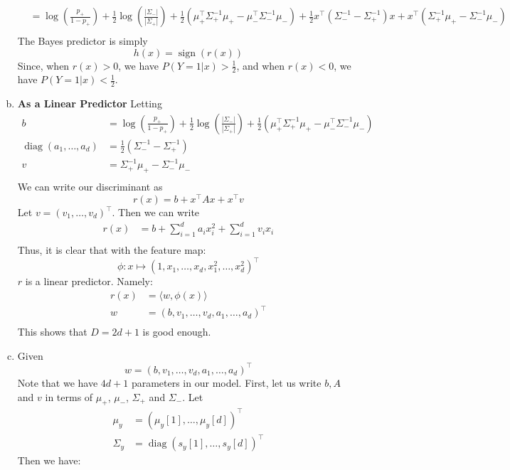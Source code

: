 \documentclass{amsart}
\DeclareMathOperator{\diag}{diag}
\DeclareMathOperator{\sign}{sign}
\theoremstyle{definition}
\begin{document}
\begin{enumerate}[(a)]
\begin{align*}
			&= \log\left(\frac{p_+}{1-p_+}\right) + \frac12 \log\left(\frac{|\Sigma_-|}{|\Sigma_+|}\right) + \frac{1}{2}(\mu_+^\intercal\Sigma_{+}^{-1}\mu_+ - \mu_-^\intercal\Sigma_{-}^{-1}\mu_-)+ \frac{1}{2}x^\intercal(\Sigma_{-}^{-1} - \Sigma_{+}^{-1})x + x^\intercal(\Sigma_+^{-1}\mu_+-\Sigma_-^{-1}\mu_-)\\
		\end{align*}
		The Bayes predictor is simply
		\[h(x) = \sign(r(x))\]
		Since, when $r(x) > 0$, we have $P(Y = 1|x) > \frac{1}{2}$, and when $r(x) < 0$, we have $P(Y = 1|x) < \frac{1}{2}$.
	\item {\bf As a Linear Predictor}
		Letting 
		\begin{align*}
			b &= \log\left(\frac{p_+}{1-p_+}\right) + \frac12 \log\left(\frac{|\Sigma_-|}{|\Sigma_+|}\right) + \frac{1}{2}(\mu_+^\intercal\Sigma_{+}^{-1}\mu_+ - \mu_-^\intercal\Sigma_{-}^{-1}\mu_-)\\
			\diag(a_1, \ldots, a_d) &= \frac{1}{2}(\Sigma_{-}^{-1} - \Sigma_{+}^{-1})\\
			v &= \Sigma_{+}^{-1}\mu_+ - \Sigma_{-}^{-1}\mu_-\\
		\end{align*}
		We can write our discriminant as
		\[r(x) = b + x^\intercal A x + x^\intercal v\]
		Let $v = (v_1, \ldots, v_d)^\intercal$. Then we can write
		\begin{align*}
			r(x) &= b + \sum_{i=1}^{d}a_ix_i^2 + \sum_{i=1}^{d}v_ix_i\\
		\end{align*}
		Thus, it is clear that with the feature map:
		\[\phi: x \mapsto (1, x_1, \ldots, x_d, x_1^2, \ldots, x_d^2)^\intercal\]
		$r$ is a linear predictor. Namely:
		\begin{align*}
			r(x) &= \langle w, \phi(x)\rangle\\
			w &= (b, v_1, \ldots, v_d, a_1, \ldots, a_d)^\intercal\\
		\end{align*}
		This shows that $D = 2d+1$ is good enough.
	\item
		Given
		\[w = (b, v_1, \ldots, v_d, a_1, \ldots, a_d)^\intercal\]
		Note that we have $4d+1$ parameters in our model. First, let us write $b, A$ and $v$ in terms of $\mu_+$, $\mu_-$, $\Sigma_+$ and $\Sigma_-$. 
		Let
		\begin{align*}
			\mu_y &= (\mu_y[1], \ldots, \mu_y[d])^\intercal\\
			\Sigma_y &= \diag(s_y[1], \ldots, s_y[d])^\intercal
		\end{align*}
		Then we have:

\end{enumerate}
\end{document}
